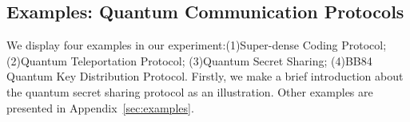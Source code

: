 \documentclass[a4paper,UKenglish,cleveref, autoref]{lipics-v2019}
\begin{document}
\subsection{Examples: Quantum Communication Protocols}
We display four examples in our experiment:(1)Super-dense Coding Protocol; (2)Quantum Teleportation Protocol; (3)Quantum Secret Sharing; (4)BB84 Quantum Key Distribution Protocol. Firstly, we make a brief introduction about the quantum secret sharing protocol as an illustration. Other examples are presented in Appendix~\ref{sec:examples}.
\end{document}
